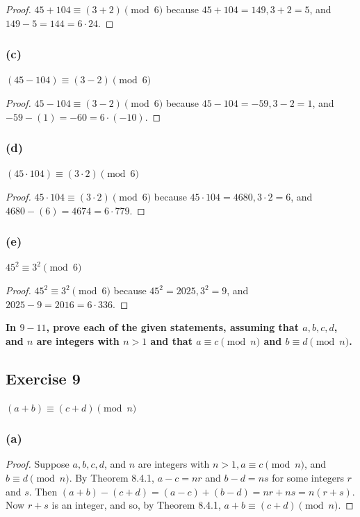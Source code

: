 \documentclass[14pt]{extarticle}
\newcommand{\cy}{\color{cyan}}
\begin{document}
\begin{proof}
        \(45 + 104 \equiv (3 + 2) \pmod 6\) because \(45 + 104 = 149, 3 + 2 = 5\), and \(149 - 5 = 144 = 6 \cdot 24\).
\end{proof}

\subsubsection{(c)}
\((45 - 104) \equiv (3 - 2) \pmod 6\)

\begin{proof}
        \(45 - 104 \equiv (3 - 2) \pmod 6\) because \(45 - 104 = -59, 3 - 2 = 1\), and \(-59 - (1) = -60 = 6 \cdot (-10)\).
\end{proof}

\subsubsection{(d)}
\((45 \cdot 104) \equiv (3 \cdot 2) \pmod 6\)

\begin{proof}
        \(45 \cdot 104 \equiv (3 \cdot 2) \pmod 6\) because \(45 \cdot 104 = 4680, 3 \cdot 2 = 6\), and \(4680 - (6) = 4674
        = 6 \cdot 779\).
\end{proof}

\subsubsection{(e)}
\(45^2 \equiv 3^2 \pmod 6\)

\begin{proof}
        \(45^2 \equiv 3^2 \pmod 6\) because \(45^2 = 2025, 3^2 = 9\), and \(2025 - 9 = 2016 = 6 \cdot 336\).
\end{proof}

{\bf \cy In $9-11$, prove each of the given statements, assuming that \(a, b, c, d\), and \(n\) are integers with
\(n > 1\) and that \(a \equiv c \pmod n\) and \(b \equiv d \pmod n\).}

\subsection{Exercise 9}
\((a + b) \equiv (c + d) \pmod n\)

\subsubsection{(a)}

\begin{proof}
        Suppose \(a, b, c, d\), and \(n\) are integers with \(n > 1, a \equiv c \pmod n\), and \(b \equiv d \pmod n\). By
        Theorem 8.4.1, \(a - c = nr\) and \(b - d = ns\) for some integers \(r\) and \(s\). Then \((a + b) - (c + d) =
        (a - c) + (b - d) = nr + ns = n(r + s)\). Now \(r + s\) is an integer, and so, by Theorem 8.4.1,
        \(a + b \equiv (c + d) \pmod n\).
\end{proof}
\end{document}

